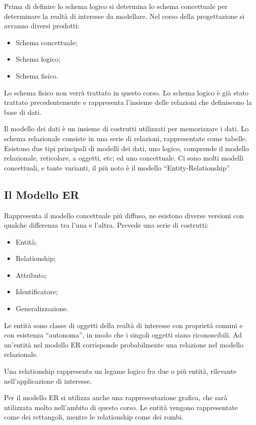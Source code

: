 \documentclass{article}
\numberwithin{equation}{subsection}
\begin{document}
Prima di definire lo schema logico si determina lo schema concettuale per determinare la realtà di interesse da modellare. Nel corso della progettazione si avranno 
diversi prodotti:
\begin{itemize}
    \item Schema concettuale;
    \item Schema logico;
    \item Schema fisico. 
\end{itemize}

Lo schema fisico non verrà trattato in questo corso. Lo schema logico è già stato trattato precedentemente e rappresenta l'insieme delle relazioni che definiscono 
la base di dati. 

Il modello dei dati è un insieme di costrutti utilizzati per memorizzare i dati. Lo schema relazionale consiste in una serie di relazioni, rappresentate come tabelle. 
Esistono due tipi principali di modelli dei dati, uno logico, comprende il modello relazionale, reticolare, a oggetti, etc; ed uno concettuale. 
Ci sono molti modelli concettuali, e tante varianti, il più noto è il modello ``Entity-Relationship''

\subsection{Il Modello ER}

Rappresenta il modello concettuale più diffuso, ne esistono diverse versioni con qualche differenza tra l'una e l'altra. Prevede una serie di costrutti:
\begin{itemize}
    \item Entità;
    \item Relationship;
    \item Attributo;
    \item Identificatore;
    \item Generalizzazione. 
\end{itemize}


Le entità sono classe di oggetti della realtà di interesse con proprietà comuni e con esistenza ``autonoma'', in modo che i singoli oggetti siano riconoscibili. 
Ad un'entità nel modello ER corrisponde probabilmente una relazione nel modello relazionale. 


Una relationship rappresenta un legame logico fra due o più entità, rilevante nell'applicazione di interesse. 

Per il modello ER si utilizza anche una rappresentazione grafica, che sarà utilizzata molto nell'ambito di questo corso. Le entità vengono rappresentate come dei 
rettangoli, mentre le relationship come dei rombi. 
\end{document}
